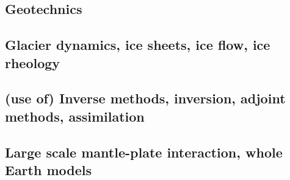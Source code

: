 \subsection{Geotechnics}

{\scriptsize
\noindent
\cite{ster99}
\cite{gora03}
\cite{zhll03}
\cite{gour04}
\cite{gork06}
\cite{bufy14}
}

\subsection{Glacier dynamics, ice sheets, ice flow, ice rheology}

{\scriptsize
\noindent
\cite{wizh94}
\cite{grev97}
\cite{frmm04}
\cite{asbl06}\cite{frmm06}
\cite{susp07}
\cite{zhjg11}
\cite{pode12}
\cite{lejx14}
\cite{issg15}\cite{frlg15}
\cite{krab16}
\cite{lolc17}
}

\subsection{(use of) Inverse methods, inversion, adjoint methods, assimilation}

{\scriptsize
\noindent
\cite{cava98}
\cite{bomo01}\cite{kapo01}
\cite{buht03}
\cite{isst04}
\cite{isks07}
\cite{splg08}\cite{ligu08}
\cite{wama09}\cite{splg09}
\cite{naco12}
\cite{wosp14}\cite{hobo14}
\cite{wahg15}
\cite{ghbu16}\cite{bocf16}
\cite{ligs17}
\cite{bofc18}
}

\subsection{Large scale mantle-plate interaction, whole Earth models}

